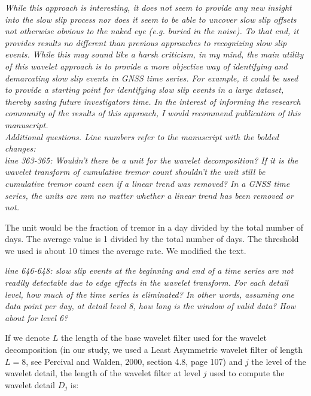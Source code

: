 \documentclass[letterpaper, 12pt]{article}
\begin{document}
\bigskip

\textit{While this approach is interesting, it does not seem to provide any new insight into the slow slip process nor does it seem to be able to uncover slow slip offsets not otherwise obvious to the naked eye (e.g. buried in the noise). To that end, it provides results no different than previous approaches to recognizing slow slip events. While this may sound like a harsh criticism, in my mind, the main utility of this wavelet approach is to provide a more objective way of identifying and demarcating slow slip events in GNSS time series. For example, it could be used to provide a starting point for identifying slow slip events in a large dataset, thereby saving future investigators time. In the interest of informing the research community of the results of this approach, I would recommend publication of this manuscript.} \\

\textit{Additional questions. Line numbers refer to the manuscript with the bolded changes:} \\

\textit{line 363-365: Wouldn't there be a unit for the wavelet decomposition? If it is the wavelet transform of cumulative tremor count shouldn't the unit still be cumulative tremor count even if a linear trend was removed? In a GNSS time series, the units are mm no matter whether a linear trend has been removed or not.}

\bigskip

The unit would be the fraction of tremor in a day divided by the total number of days. The average value is 1 divided by the total number of days. The threshold we used is about 10 times the average rate. We modified the text.

\bigskip

\textit{line 646-648: slow slip events at the beginning and end of a time series are not readily detectable due to edge effects in the wavelet transform. For each detail level, how much of the time series is eliminated? In other words, assuming one data point per day, at detail level 8, how long is the window of valid data? How about for level 6?}

\bigskip

If we denote $L$ the length of the base wavelet filter used for the wavelet decomposition (in our study, we used a Least Asymmetric wavelet filter of length $L = 8$, see Percival and Walden, 2000, section 4.8, page 107) and $j$ the level of the wavelet detail, the length of the wavelet filter at level $j$ used to compute the wavelet detail $D_j$ is:
\end{document}
